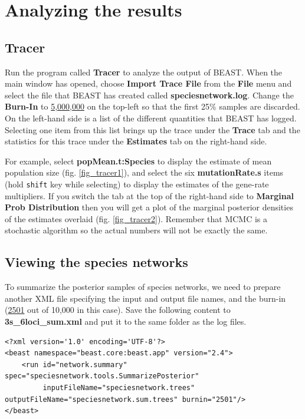 \documentclass[11pt]{article}
\begin{document}
\section*{Analyzing the results}

\subsection*{Tracer}

Run the program called \textbf{Tracer} to analyze the output of BEAST. When the main window has opened, choose \textbf{Import Trace File} from the \textbf{File} menu and select the file that BEAST has created called \textbf{speciesnetwork.log}. Change the \textbf{Burn-In} to \underline{5,000,000} on the top-left so that the first 25\% samples are discarded.
On the left-hand side is a list of the different quantities that BEAST has logged. Selecting one item from this list brings up the trace under the \textbf{Trace} tab and the statistics for this trace under the \textbf{Estimates} tab on the right-hand side.

For example, select \textbf{popMean.t:Species} to display the estimate of mean population size (fig. \ref{fig_tracer1}), and select the six \textbf{mutationRate.s} items (hold \texttt{shift} key while selecting) to display the estimates of the gene-rate multipliers. If you switch the tab at the top of the right-hand side to {\bf Marginal Prob Distribution} then you will get a plot of the marginal posterior densities of the estimates overlaid (fig. \ref{fig_tracer2}).
Remember that MCMC is a stochastic algorithm so the actual numbers will not be exactly the same.

\subsection*{Viewing the species networks}

To summarize the posterior samples of species networks, we need to prepare another XML file specifying the input and output file names, and the burn-in (\underline{2501} out of 10,000 in this case). Save the following content to \textbf{3s\_6loci\_sum.xml} and put it to the same folder as the log files.

{\tiny
\begin{verbatim}
<?xml version='1.0' encoding='UTF-8'?>
<beast namespace="beast.core:beast.app" version="2.4">
    <run id="network.summary" spec="speciesnetwork.tools.SummarizePosterior"
         inputFileName="speciesnetwork.trees" outputFileName="speciesnetwork.sum.trees" burnin="2501"/>
</beast>
\end{verbatim}}
\end{document}
